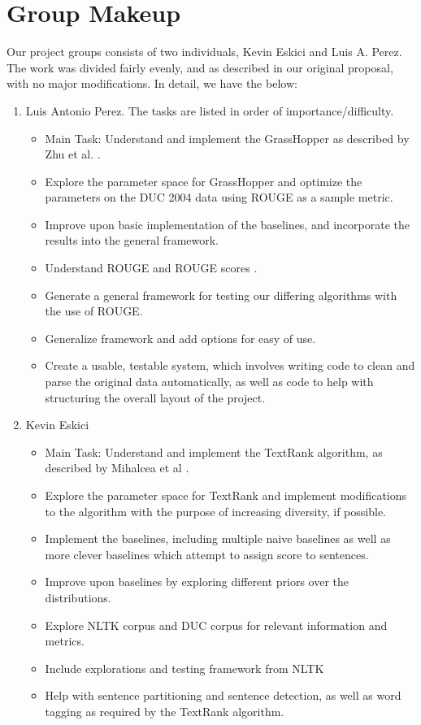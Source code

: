 \documentclass[10pt]{article}
\begin{document}
\section{Group Makeup}
Our project groups consists of two individuals, Kevin Eskici and Luis A. Perez. The work was divided fairly evenly, and as described in our original proposal, with no major modifications. In detail, we have the below:
\begin{enumerate}
\item Luis Antonio Perez. The tasks are listed in order of importance/difficulty.
\begin{itemize}
\item Main Task: Understand and implement the {\sc GrassHopper} as described by Zhu et al. \cite{grasshopper}.
\item Explore the parameter space for {\sc GrassHopper} and optimize the parameters on the DUC 2004 data using ROUGE as a sample metric.
\item Improve upon basic implementation of the baselines, and incorporate the results into the general framework.
\item Understand ROUGE and ROUGE scores \cite{rouge}.
\item Generate a general framework for testing our differing algorithms with the use of ROUGE.
\item Generalize framework and add options for easy of use.
\item Create a usable, testable system, which involves writing code to clean and parse the original data automatically, as well as code to help with structuring the overall layout of the project.
\end{itemize}
\item Kevin Eskici
\begin{itemize}
\item Main Task: Understand and implement the {\sc TextRank} algorithm, as described by Mihalcea et al \cite{textrank}.
\item Explore the parameter space for {\sc TextRank} and implement modifications to the algorithm with the purpose of increasing diversity, if possible.
\item Implement the baselines, including multiple naive baselines as well as more clever baselines which attempt to assign score to sentences.
\item Improve upon baselines by exploring different priors over the distributions.
\item Explore NLTK corpus and DUC corpus for relevant information and metrics.
\item Include explorations and testing framework from NLTK
\item Help with sentence partitioning and sentence detection, as well as word tagging as required by the TextRank algorithm.
\end{itemize}
\end{enumerate}
\end{document}
